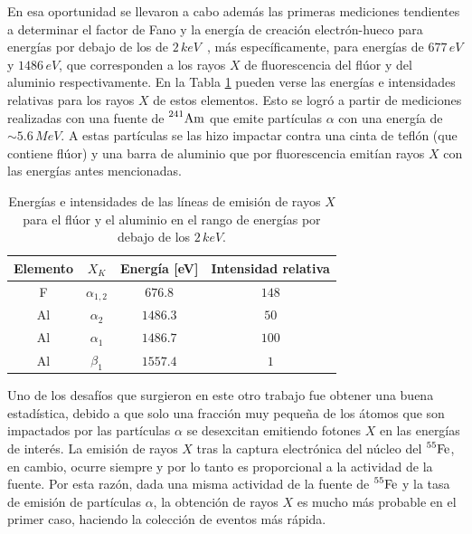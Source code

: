 En esa oportunidad se llevaron a cabo además las primeras mediciones tendientes a determinar el factor de Fano y la energía de creación electrón-hueco para energías por debajo de los de $2\,\si{keV}$~\cite{TesisKevin}, más específicamente, para energías de $677\,\si{eV}$ y $1486\,\si{eV}$, que corresponden a los rayos $X$ de fluorescencia del flúor y del aluminio respectivamente. 
En la Tabla \ref{tab:EnergiasFluorescenciaFAl} pueden verse las energías e intensidades relativas para los rayos $X$ de estos elementos. 
Esto se logró a partir de mediciones realizadas con una fuente de $\prescript{241}{}{\mbox{Am}}$ que emite partículas $\alpha$ con una energía de $\sim 5.6\,\si{MeV}$. 
A estas partículas se las hizo impactar contra una cinta de teflón (que contiene flúor) y una barra de aluminio que por fluorescencia emitían rayos $X$ con las energías antes mencionadas. 
\begin{table}[h]
\centering
\begin{tabular}{@{}cccc@{}}
\toprule
Elemento    &   $X_{K}$         &   Energía [eV]    &   Intensidad relativa \\ \hline \hline
F           &   $\alpha_{1,2}$  &   $676.8$         &   $148$               \\
Al          &   $\alpha_{2}$    &   $1486.3$        &   $50$                \\
Al          &   $\alpha_{1}$    &   $1486.7$        &   $100$               \\
Al          &   $\beta_{1}$     &   $1557.4$        &   $1$                 \\ \bottomrule
\end{tabular}
\caption{Energías e intensidades de las líneas de emisión de rayos $X$ para el flúor y el aluminio en el rango de energías por debajo de los $2\,\si{keV}$.}
\label{tab:EnergiasFluorescenciaFAl}
\end{table}

Uno de los desafíos que surgieron en este otro trabajo fue obtener una buena estadística, debido a que solo una fracción muy pequeña de los átomos que son impactados por las partículas $\alpha$ se desexcitan emitiendo fotones $X$ en las energías de interés. La emisión de rayos $X$ tras la captura electrónica del núcleo del $\prescript{55}{}{\mbox{Fe}}$, en cambio, ocurre siempre y por lo tanto es proporcional a la actividad de la fuente. Por esta razón, dada una misma actividad de la fuente de $\prescript{55}{}{\mbox{Fe}}$ y la tasa de emisión de partículas $\alpha$, la obtención de rayos $X$ es mucho más probable en el primer caso, haciendo la colección de eventos más rápida.

